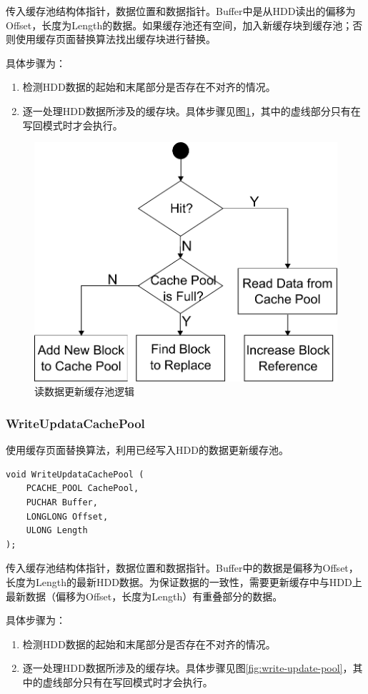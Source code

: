 传入缓存池结构体指针，数据位置和数据指针。Buffer中是从HDD读出的偏移为Offset，长度为Length的数据。如果缓存池还有空间，加入新缓存块到缓存池；否则使用缓存页面替换算法找出缓存块进行替换。

具体步骤为：
\begin{enumerate}
\item 检测HDD数据的起始和末尾部分是否存在不对齐的情况。
\item 逐一处理HDD数据所涉及的缓存块。具体步骤见图\ref{fig:read-update-pool}，其中的虚线部分只有在写回模式时才会执行。
\end{enumerate}

\begin{figure}[H]
\centering
\includegraphics[width=0.6\linewidth]{./graph/read-update-pool}
\caption{读数据更新缓存池逻辑}
\label{fig:read-update-pool}
\end{figure}

\subsubsection{WriteUpdataCachePool}
使用缓存页面替换算法，利用已经写入HDD的数据更新缓存池。
\begin{lstlisting}
void WriteUpdataCachePool (
    PCACHE_POOL CachePool,
    PUCHAR Buffer,
    LONGLONG Offset,
    ULONG Length
);
\end{lstlisting}

传入缓存池结构体指针，数据位置和数据指针。Buffer中的数据是偏移为Offset，长度为Length的最新HDD数据。为保证数据的一致性，需要更新缓存中与HDD上最新数据（偏移为Offset，长度为Length）有重叠部分的数据。

具体步骤为：
\begin{enumerate}
\item 检测HDD数据的起始和末尾部分是否存在不对齐的情况。
\item 逐一处理HDD数据所涉及的缓存块。具体步骤见图\ref{fig:write-update-pool}，其中的虚线部分只有在写回模式时才会执行。
\end{enumerate}

